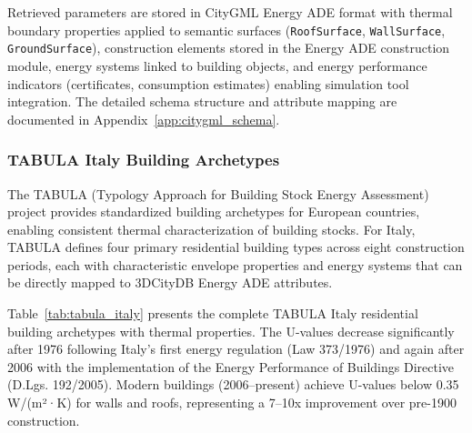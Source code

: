 Retrieved parameters are stored in CityGML Energy ADE format with thermal boundary properties applied to semantic surfaces (\texttt{RoofSurface}, \texttt{WallSurface}, \texttt{GroundSurface}), construction elements stored in the Energy ADE construction module, energy systems linked to building objects, and energy performance indicators (certificates, consumption estimates) enabling simulation tool integration. The detailed schema structure and attribute mapping are documented in Appendix~\ref{app:citygml_schema}.

\subsubsection{TABULA Italy Building Archetypes}

The TABULA (Typology Approach for Building Stock Energy Assessment) project provides standardized building archetypes for European countries, enabling consistent thermal characterization of building stocks. For Italy, TABULA defines four primary residential building types across eight construction periods, each with characteristic envelope properties and energy systems that can be directly mapped to 3DCityDB Energy ADE attributes.

Table~\ref{tab:tabula_italy} presents the complete TABULA Italy residential building archetypes with thermal properties. The U-values decrease significantly after 1976 following Italy's first energy regulation (Law 373/1976) and again after 2006 with the implementation of the Energy Performance of Buildings Directive (D.Lgs. 192/2005). Modern buildings (2006--present) achieve U-values below 0.35 W/(m²·K) for walls and roofs, representing a 7--10x improvement over pre-1900 construction.

